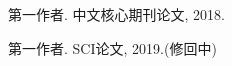 
\begin{publications}{99}
    \item\textsc{第一作者}. {中文核心期刊论文}, 2018.
    \item\textsc{第一作者}. {SCI论文}, 2019.(修回中)
\end{publications}

